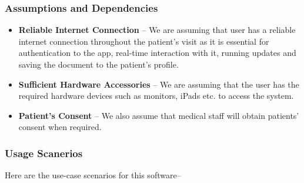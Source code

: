 \documentclass[12pt]{article}
\begin{document}
\subsubsection{Assumptions and Dependencies} \label{sec_assumpt}

\begin{itemize}
  \item\textbf{Reliable Internet Connection} -- We are assuming that user has a reliable internet connection throughout the patient’s visit as it is essential for authentication to the app, real-time interaction with it, running updates and saving the document to the patient’s profile.
  \item\textbf{Sufficient Hardware Accessories} -- We are assuming that the user has the required hardware devices such as monitors, iPads etc. to access the system.
  \item\textbf{Patient’s Consent} -- We also assume that medical staff will obtain patients’ consent when required.
\end{itemize}

\subsubsection{Usage Scanerios}

Here are the use-case scenarios for this software--
\end{document}
